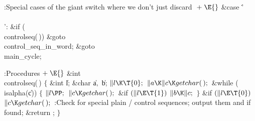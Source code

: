 \B{}:Special cases of the giant switch where we don't just discard \X${}\mathrel+\E{}$\6
\4\&{case} \.{'\\\\'}:\6
\&{if} (\\{controlseq}(\,))\1\5
\&{goto} \\{control\_seq\_in\_word};\2\6
\&{goto} \\{main\_cycle};\par
\fi

\B{}:Procedures\X${}\mathrel+\E{}$\6
\1\1\&{int} \\{controlseq}(\,)\2\2\6
${}\{{}$\1\6
\&{int} \|l;\6
\&{char} \|a${},{}$ \|b;\7
${}\|l\K\T{0};{}$\6
${}\|a\K\|c\K\\{getchar}(\,);{}$\6
\&{while} (\\{isalpha}(\|c))\5
${}\{{}$\1\6
${}\|l\PP;{}$\6
${}\|c\K\\{getchar}(\,);{}$\6
\&{if} ${}(\|l\E\T{1}){}$\1\5
${}\|b\K\|c;{}$\2\6
\4${}\}{}$\2\6
\&{if} ${}(\|l\E\T{0}){}$\1\5
${}\|c\K\\{getchar}(\,);{}$\2\6
:Check for special plain \TEX/ control sequences; output them and  if found\X;\6
\&{return} ;\6
\4${}\}{}$\2\par
\fi

